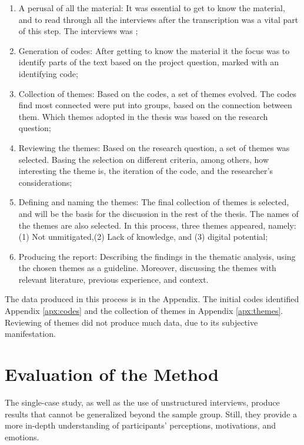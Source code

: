 \begin{enumerate}
    \item A perusal of all the material: It was essential to get to know the material, and to read through all the interviews after the transcription was a vital part of this step. The interviews was ; 
    \item Generation of codes: After getting to know the material it the focus was to identify parts of the text based on the project question, marked with an identifying code; 
    \item Collection of themes: Based on the codes, a set of themes evolved. The codes find most connected were put into groups, based on the connection between them. Which themes adopted in the thesis was based on the research question; 
    \item  Reviewing the themes: Based on the research question, a set of themes was selected. Basing the selection on different criteria, among others, how interesting the theme is, the iteration of the code, and the researcher's considerations; 
    \item Defining and naming the themes: The final collection of themes is selected, and will be the basis for the discussion in the rest of the thesis. The names of the themes are also selected. In this process, three themes appeared, namely: (1) Not unmitigated,(2) Lack of knowledge, and (3) digital potential; 
    \item Producing the report: Describing the findings in the thematic analysis, using the chosen themes as a guideline. Moreover, discussing the themes with relevant literature, previous experience, and context.
\end{enumerate}

The data produced in this process is in the Appendix. The initial codes identified Appendix \ref{apx:codes} and the collection of themes in Appendix \ref{apx:themes}.
Reviewing of themes did not produce much data, due to its subjective manifestation. 

\section{Evaluation of the Method}
The single-case study, as well as the use of unstructured interviews, produce results that cannot be generalized beyond the sample group. Still, they provide a more in-depth understanding of participants’ perceptions, motivations, and emotions. 

